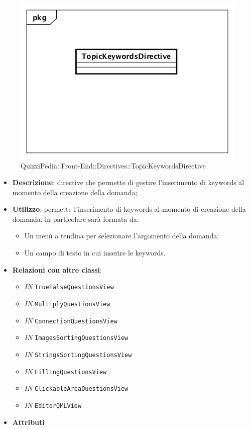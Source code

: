 \label{QuizziPedia::Front-End::Directives::TopicKeywordsDirective}

\begin{figure}[h]
	\centering
	\includegraphics[scale=0.5,keepaspectratio]{UML/Classi/Front-End/QuizziPedia_Front-end_Directives_TopicKeywordsDirective.png}
	\caption{QuizziPedia::Front-End::Directives::TopicKeywordsDirective}
\end{figure}

\begin{itemize}
	\item \textbf{Descrizione}: directive che permette di gestire l'inserimento di keywords al momento della creazione della domanda;
	\item \textbf{Utilizzo}: permette l'inserimento di keywords al momento di creazione della domanda, in particolare sarà formata da:
	\begin{itemize}
		\item Un menù a tendina per selezionare l'argomento della domanda;
		\item Un campo di testo in cui inserire le keywords.
	\end{itemize}
	\item \textbf{Relazioni con altre classi}:
	\begin{itemize}
		\item \textit{IN} \texttt{TrueFalseQuestionsView} 
		\item \textit{IN} \texttt{MultiplyQuestionsView} 
		\item \textit{IN} \texttt{ConnectionQuestionsView}
		\item \textit{IN} \texttt{ImagesSortingQuestionsView} 
		\item \textit{IN} \texttt{StringsSortingQuestionsView} 
		\item \textit{IN} \texttt{FillingQuestionsView} 
		\item \textit{IN} \texttt{ClickableAreaQuestionsView} 
		\item \textit{IN} \texttt{EditorQMLView} 
	\end{itemize}
	\item \textbf{Attributi}
\end{itemize}


